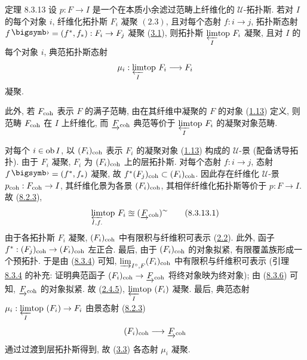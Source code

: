 \begin{enonce*}{定理 8.3.13}
设 $p:F\to I$ 是一个在本质小余滤过范畴上纤维化的 $𝒰$-拓扑斯.
若对 $I$ 的每个对象 $i$,
纤维化拓扑斯 $F_i$ 凝聚
$(\hyperref[VI.def2.3]{2.3})$,
且对每个态射 $f:i\to j$,
拓扑斯态射 $f\bigdot=(f^{\ast},f_{\ast}):F_i\to F_j$
凝聚 (\hyperref[VI.def3.1]{3.1}),
则拓扑斯 ${\displaystyle{\varprojlim_{I}\!\mbox{\rm top }}}F_i$ 凝聚,
且对 $I$ 的每个对象 $i$,
典范拓扑斯态射
$$
\mu_i : \limtop{I} F_i \to F_i
$$
凝聚.

此外, 若 $F_{\mathrm{coh}}$ 表示 $F$ 的满子范畴,
由在其纤维中凝聚的 $F$ 的对象
(\hyperref[VI.def1.13]{1.13}) 定义,
则范畴 $F_{\mathrm{coh}}$ 在 $I$ 上纤维化,
而 $\underrightarrow{F}_{\mathrm{coh}}$
典范等价于 ${\displaystyle{\varprojlim_{I}\!\mbox{\rm top }}}F_i$ 的凝聚对象范畴.
\end{enonce*}

对每个\pageoriginale{} $i\in\operatorname{ob} I$,
以 $(F_i)_{\mathrm{coh}}$ 表示 $F_i$ 的凝聚对象
(\hyperref[VI.def1.13]{1.13}) 构成的 $𝒰$-景
(配备诱导拓扑).
由于 $F_i$ 凝聚, $F_i$ 为 $(F_i)_{\mathrm{coh}}$ 上的层拓扑斯.
对每个态射 $f:i\to j$,
态射 $f\bigdot=(f^{\ast},f_{\ast})$ 凝聚,
故 $f^{\ast}(F_j)_{\mathrm{coh}}\subset(F_i)_{\mathrm{coh}}$.
因此存在纤维化 $𝒰$-景 $p_{\coh}:F_{\coh}\to I$,
其纤维化景为各景 $(F_i)_{\mathrm{coh}}$,
其相伴纤维化拓扑斯等价于 $p:F\to I$.
故 (\hyperref[VI.thm8.2.3]{8.2.3}),
\begin{equation*}
{\displaystyle{\varprojlim_{I, f.}\!\mbox{\rm top }}} F_i \approxeq
(\underrightarrow{F}_{\mathrm{coh}})^{\sim}\tag{8.3.13.1}
\end{equation*}
由于各拓扑斯 $F_i$ 凝聚,
$(F_i)_{\mathrm{coh}}$ 中有限积与纤维积可表示
(\hyperref[VI.prop2.2]{2.2}).
此外, 函子 $f^{\ast}:(F_j)_{\coh}\to(F_i)_{\coh}$ 左正合.
最后, 由于 $(F_i)_{\mathrm{coh}}$ 的对象拟紧,
有限覆盖族形成一个预拓扑.
于是由 (\hyperref[VI.lem8.3.4]{8.3.4}) 可知,
$\varinjlim_{I^{\circ},F}(F_i)_{\mathrm{coh}}$ 中有限积与纤维积可表示
(引理 \hyperref[VI.lem8.3.4]{8.3.4} 的补充:
证明典范函子 $(F_i)_{\coh}\to\underrightarrow{F}_{\coh}$
将终对象映为终对象);
由 (\hyperref[VI.prop8.3.6]{8.3.6}) 可知,
$\underrightarrow{F}_{\mathrm{coh}}$ 的对象拟紧.
故 (\hyperref[VI.subsubsec2.4.5]{2.4.5}),
${\displaystyle{\varprojlim_{I}\!\mbox{\rm top }}}(F_i)$ 凝聚.
最后, 典范态射 $\mu_i:\limtop{I}(F_i)\to F_i$
由景态射 (\hyperref[VI.thm8.2.3]{8.2.3})
$$
(F_i)_{\coh} \to \underrightarrow{F}_{\coh}
$$
通过过渡到层拓扑斯得到,
故 (\hyperref[VI.cor3.3]{3.3}) 各态射 $\mu_i$ 凝聚.

